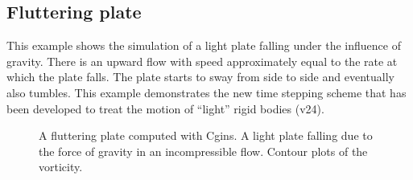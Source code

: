 \subsection{Fluttering plate}\label{sec:flutteringPlate}

This example shows the simulation of a light plate falling under the influence
of gravity. There is an upward flow with speed approximately equal to the
rate at which the plate falls. The plate starts to sway from side to side and
eventually also tumbles.
This example demonstrates the new time stepping scheme that has been developed
to treat the motion of ``light'' rigid bodies (v24). 

% 
{
\newcommand{\figWidthd}{6.5cm}
\newcommand{\trimfig}[2]{\trimPlot{#1}{#2}{.0}{.0}{.0}{.0}}
\begin{figure}[hbt]
\begin{center}
\end{center}
\caption{A fluttering plate computed with Cgins. A light plate falling due to the force of gravity in an incompressible flow.
        Contour plots of the vorticity.}
\end{figure}
}


